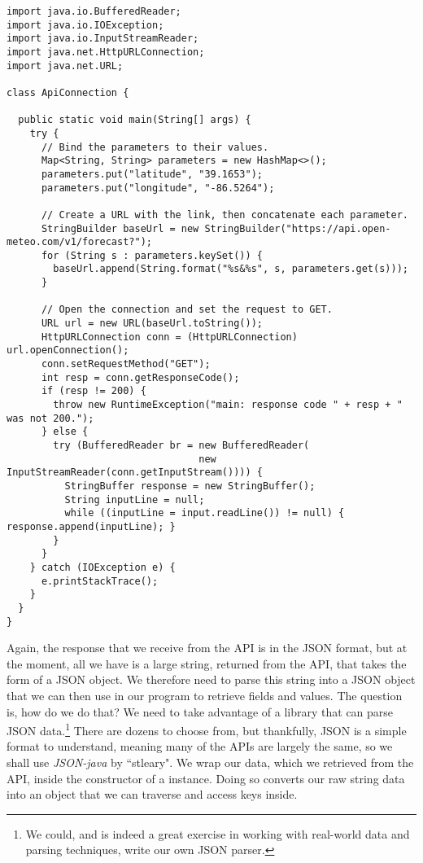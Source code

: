 \begin{cl}[]{}
\begin{lstlisting}[language=MyJava]
import java.io.BufferedReader;
import java.io.IOException;
import java.io.InputStreamReader;
import java.net.HttpURLConnection;
import java.net.URL;

class ApiConnection {

  public static void main(String[] args) {
    try {
      // Bind the parameters to their values.
      Map<String, String> parameters = new HashMap<>();
      parameters.put("latitude", "39.1653");
      parameters.put("longitude", "-86.5264");

      // Create a URL with the link, then concatenate each parameter.
      StringBuilder baseUrl = new StringBuilder("https://api.open-meteo.com/v1/forecast?");
      for (String s : parameters.keySet()) { 
        baseUrl.append(String.format("%s&%s", s, parameters.get(s))); 
      }
    
      // Open the connection and set the request to GET.
      URL url = new URL(baseUrl.toString());
      HttpURLConnection conn = (HttpURLConnection) url.openConnection();
      conn.setRequestMethod("GET");
      int resp = conn.getResponseCode();
      if (resp != 200) {
        throw new RuntimeException("main: response code " + resp + " was not 200.");
      } else {
        try (BufferedReader br = new BufferedReader(
                                 new InputStreamReader(conn.getInputStream()))) {
          StringBuffer response = new StringBuffer();
          String inputLine = null;
          while ((inputLine = input.readLine()) != null) { response.append(inputLine); }
        }
      }
    } catch (IOException e) {
      e.printStackTrace();
    }
  }
}
\end{lstlisting}
\end{cl}

Again, the response that we receive from the API is in the JSON format, but at the moment, all we have is a large string, returned from the API, that takes the form of a JSON object. We therefore need to parse this string into a JSON object that we can then use in our program to retrieve fields and values. The question is, how do we do that? We need to take advantage of a library that can parse JSON data.\footnote{We could, and is indeed a great exercise in working with real-world data and parsing techniques, write our own JSON parser.} There are dozens to choose from, but thankfully, JSON is a simple format to understand, meaning many of the APIs are largely the same, so we shall use \textit{JSON-java} by ``stleary". We wrap our data, which we retrieved from the API, inside the constructor of a  instance. Doing so converts our raw string data into an object that we can traverse and access keys inside. 

